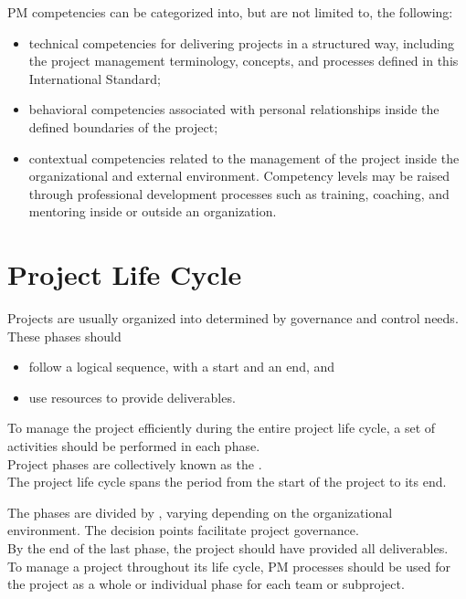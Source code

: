 \documentclass[letterpaper,10pt,english]{jupyterBook}
\begin{document}
\sphinxAtStartPar
PM competencies can be categorized into, but are not limited to, the following:
\begin{itemize}
\item {} 
\sphinxAtStartPar
technical competencies for delivering projects in a structured way, including the project management terminology, concepts, and processes defined in this International Standard;

\item {} 
\sphinxAtStartPar
behavioral competencies associated with personal relationships inside the defined boundaries of the project;

\item {} 
\sphinxAtStartPar
contextual competencies related to the management of the project inside the organizational and external environment.
Competency levels may be raised through professional development processes such as training, coaching, and mentoring inside or outside an organization.

\end{itemize}


\section{Project Life Cycle}
\label{\detokenize{PM/pm-concepts:project-life-cycle}}
\sphinxAtStartPar
Projects are usually organized into  determined by governance and control needs. \\
These phases should
\begin{itemize}
\item {} 
\sphinxAtStartPar
follow a logical sequence, with a start and an end, and

\item {} 
\sphinxAtStartPar
use resources to provide deliverables.

\end{itemize}

\sphinxAtStartPar
To manage the project efficiently during the entire project life cycle, a set of activities should be performed in each phase. \\
Project phases are collectively known as the . \\
The project life cycle spans the period from the start of the project to its end.

\sphinxAtStartPar
The phases are divided by , varying depending on the organizational environment.
The decision points facilitate project governance. \\
By the end of the last phase, the project should have provided all deliverables. \\
To manage a project throughout its life cycle, PM processes should be used for the project as a whole or individual phase for each team or sub\sphinxhyphen{}project.
\end{document}
